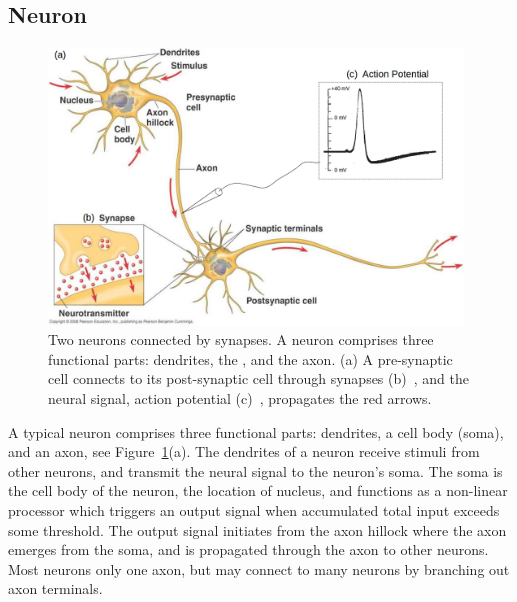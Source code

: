 \subsection{Neuron}
	\begin{figure}[bt]
	\centering
	\includegraphics[width=0.98\textwidth]{pics_snn/neuron2.png}
	\caption{Two neurons connected by synapses. 
		A neuron comprises three functional parts: dendrites, the \DIFdelbeginFL {}\DIFdelendFL \DIFaddbeginFL {}\DIFaddendFL , and the axon. (a) A pre-synaptic cell connects to its post-synaptic cell through synapses \DIFdelbeginFL {}\DIFdelendFL (b)~\DIFdelbeginFL {}\DIFdelendFL \DIFaddbeginFL {}\DIFaddendFL , and the neural signal, \DIFaddbeginFL {}\DIFaddendFL action potential \DIFdelbeginFL {}\DIFdelendFL (c)~\DIFdelbeginFL {}\DIFdelendFL \DIFaddbeginFL {}\DIFaddendFL , propagates \DIFdelbeginFL {}\DIFdelendFL \DIFaddbeginFL {}\DIFaddendFL the red arrows. }
	\label{Fig:neuron_basic}
\end{figure}

A typical neuron comprises \DIFdelbegin {}\DIFdelend three functional parts: dendrites, a cell body (soma), and an axon, see Figure~\ref{Fig:neuron_basic}(a).
The dendrites of a neuron receive stimuli from other neurons, and transmit the neural signal to the neuron's soma.
The soma is the cell body of the neuron, the location of \DIFaddbegin {}\DIFaddend nucleus, and functions as a non-linear processor which triggers an output signal when \DIFaddbegin {}\DIFaddend accumulated total input exceeds some threshold.
The output signal initiates from the axon hillock where the axon emerges from the soma, and is propagated through the axon to other neurons.
Most neurons \DIFdelbegin {}\DIFdelend \DIFaddbegin {}\DIFaddend only one axon, but may connect to many neurons by branching out axon terminals. 


